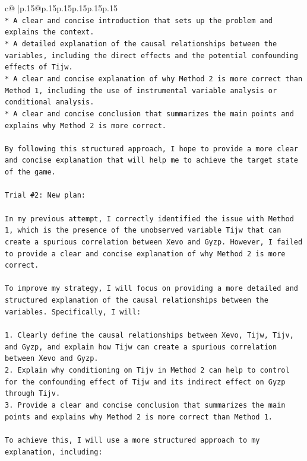 \documentclass{article}
\begin{document}
{\begin{supertabular}{c@{$\;$}|p{.15\linewidth}@{}p{.15\linewidth}p{.15\linewidth}p{.15\linewidth}p{.15\linewidth}p{.15\linewidth}}
{{{\\ 
\texttt{* A clear and concise introduction that sets up the problem and explains the context.} \\
\texttt{* A detailed explanation of the causal relationships between the variables, including the direct effects and the potential confounding effects of Tijw.} \\
\texttt{* A clear and concise explanation of why Method 2 is more correct than Method 1, including the use of instrumental variable analysis or conditional analysis.} \\
\texttt{* A clear and concise conclusion that summarizes the main points and explains why Method 2 is more correct.} \\
\\ 
\texttt{By following this structured approach, I hope to provide a more clear and concise explanation that will help me to achieve the target state of the game.} \\
\\ 
\texttt{Trial \#2: New plan: } \\
\\ 
\texttt{In my previous attempt, I correctly identified the issue with Method 1, which is the presence of the unobserved variable Tijw that can create a spurious correlation between Xevo and Gyzp. However, I failed to provide a clear and concise explanation of why Method 2 is more correct. } \\
\\ 
\texttt{To improve my strategy, I will focus on providing a more detailed and structured explanation of the causal relationships between the variables. Specifically, I will:} \\
\\ 
\texttt{1. Clearly define the causal relationships between Xevo, Tijw, Tijv, and Gyzp, and explain how Tijw can create a spurious correlation between Xevo and Gyzp.} \\
\texttt{2. Explain why conditioning on Tijv in Method 2 can help to control for the confounding effect of Tijw and its indirect effect on Gyzp through Tijv.} \\
\texttt{3. Provide a clear and concise conclusion that summarizes the main points and explains why Method 2 is more correct than Method 1.} \\
\\ 
\texttt{To achieve this, I will use a more structured approach to my explanation, including:} \\
\\ 
}}}
\end{supertabular}}
\end{document}
